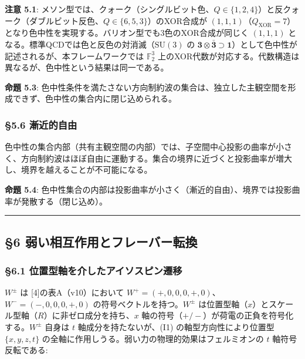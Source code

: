\documentclass[
  a4paper,11pt]{ltjsarticle}
\theoremstyle{definition}
\theoremstyle{remark}
\begin{document}
\textbf{注意 5.1}:
メソン型では、クォーク（シングルビット色、\(Q \in \{1,2,4\}\)）と反クォーク（ダブルビット反色、\(Q \in \{6,5,3\}\)）のXOR合成が
\((1,1,1)\)（\(Q_{\mathrm{XOR}} = 7\)）となり色中性を実現する。バリオン型でも3色のXOR合成が同じく
\((1,1,1)\) となる。標準QCDでは色と反色の対消滅（\(\mathrm{SU}(3)\) の
\(\mathbf{3} \otimes \bar{\mathbf{3}} \supset \mathbf{1}\)）として色中性が記述されるが、本フレームワークでは
\(\mathbb{F}_2^3\)
上のXOR代数が対応する。代数構造は異なるが、色中性という結果は同一である。

\textbf{命題 5.3}:
色中性条件を満たさない方向制約波の集合は、独立した主観空間を形成できず、色中性の集合内に閉じ込められる。

\subsubsection{§5.6 漸近的自由}\label{ux6f38ux8fd1ux7684ux81eaux7531}

色中性の集合内部（共有主観空間の内部）では、子空間中心投影の曲率が小さく、方向制約波はほぼ自由に運動する。集合の境界に近づくと投影曲率が増大し、境界を越えることが不可能になる。

\textbf{命題 5.4}:
色中性集合の内部は投影曲率が小さく（漸近的自由）、境界では投影曲率が発散する（閉じ込め）。

\begin{center}\rule{0.5\linewidth}{0.5pt}\end{center}

\subsection{§6
弱い相互作用とフレーバー転換}\label{ux5f31ux3044ux76f8ux4e92ux4f5cux7528ux3068ux30d5ux30ecux30fcux30d0ux30fcux8ee2ux63db}

\subsubsection{§6.1
位置型軸を介したアイソスピン遷移}\label{ux4f4dux7f6eux578bux8ef8ux3092ux4ecbux3057ux305fux30a2ux30a4ux30bdux30b9ux30d4ux30f3ux9077ux79fb}

\(W^{\pm}\) は {[}4{]}の表A（v10）において
\(W^+ = (+, 0, 0, 0, +, 0)\)、\(W^- = (-, 0, 0, 0, +, 0)\)
の符号ベクトルを持つ。\(W^{\pm}\)
は位置型軸（\(x\)）とスケール型軸（\(R\)）に非ゼロ成分を持ち、\(x\)
軸の符号（\(+/-\)）が荷電の正負を符号化する。\(W^{\pm}\) 自身は \(t\)
軸成分を持たないが、(I1) の軸型方向性により位置型 \(\{x, y, z, t\}\)
の全軸に作用しうる。弱い力の物理的効果はフェルミオンの \(t\)
軸符号反転である:
\end{document}
